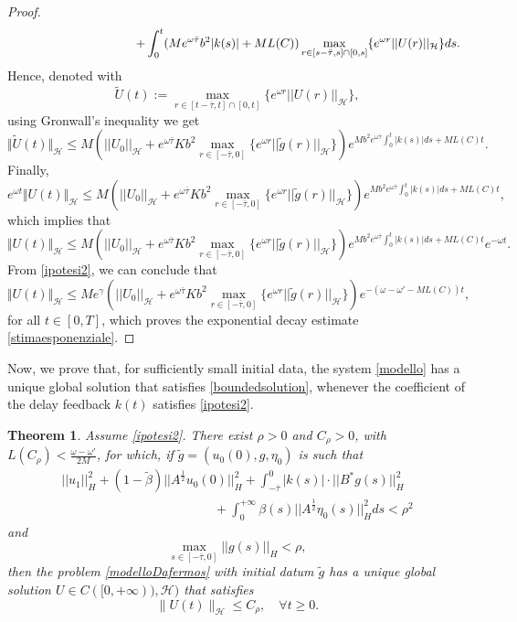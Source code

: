 \documentclass[11pt]{article}
\newtheorem{Theorem}{Theorem}[section]
\renewcommand{\geq}{\geqslant}
\renewcommand{\leq}{\leqslant}
\renewcommand{\le}{\leqslant}
\begin{document}
\begin{proof}
$$\begin{array}{l}
	\hspace{2 cm}
	\displaystyle{\hspace{1.5cm} +\int_{0}^{t}(Me^{\omega\bar{\tau}}b^2|k(s)|+ML(C))\max_{r\in[s-\bar{\tau},s]\cap[0,s]}\{e^{\omega r}||U(r)||_{\mathcal H}\} ds.}
\end{array}
$$
Hence, denoted with 
$$\tilde{U}(t):=\max_{r\in[t-\bar{\tau},t]\cap[0,t]}\{e^{\omega r} ||U(r)||_{\mathcal H} \},$$
using Gronwall's inequality we get
$$
\Vert \tilde U(t)\Vert_{\mathcal H}\le
M\left(||U_0||_{\mathcal H}+e^{\omega\bar{\tau}}Kb^2\max_{r\in[-\bar{\tau},0]}\{e^{\omega r}||\tilde{g}(r)||_{\mathcal H}\}\right)e^{Mb^2e^{\omega\bar{\tau}}\int_{0}^{t}|k(s)|ds+ML(C)t}.
$$
Finally,
$$e^{\omega t}\Vert U(t)\Vert_{\mathcal H}\leq M\left(||U_0||_{\mathcal H}+e^{\omega\bar{\tau}}Kb^2\max_{r\in[-\bar{\tau},0]}\{e^{\omega r}||\tilde{g}(r)||_{\mathcal H}\}\right)e^{Mb^2e^{\omega\bar{\tau}}\int_{0}^{t}|k(s)|ds+ML(C)t},$$
which implies that
$$\Vert U(t)\Vert_{\mathcal H}\leq M\left(||U_0||_{\mathcal H}+e^{\omega\bar{\tau}}Kb^2\max_{r\in[-\bar{\tau},0]}\{e^{\omega r}||\tilde{g}(r)||_{\mathcal H}\}\right)e^{Mb^2e^{\omega\bar{\tau}}\int_{0}^{t}|k(s)|ds+ML(C)t}e^{-\omega t}.$$
From \eqref{ipotesi2}, we can conclude that
$$\Vert  U(t)\Vert_{\mathcal H}\le Me^{\gamma}\left(||U_0||_{\mathcal H}+e^{\omega\bar{\tau}}Kb^2\max_{r\in[-\bar{\tau},0]}\{e^{\omega r}||\tilde{g}(r)||_{\mathcal H}\}\right)e^{-(\omega-\omega'-ML(C))t},$$
for all $t\in [0,T]$, which proves the exponential decay estimate \eqref{stimaesponenziale}. 
\end{proof}
Now, we prove that, for sufficiently small initial data, the system \eqref{modello} has a unique global solution that satisfies \eqref{boundedsolution}, whenever the coefficient of the delay feedback $k(t)$ satisfies \eqref{ipotesi2}.
\begin{Theorem}\label{teorema2.5}
	Assume \eqref{ipotesi2}. There exist $\rho>0$ and $C_{\rho}>0$, with $L(C_{\rho})<\frac{\omega-\omega'}{2M}$, for which, if $\tilde g=(u_0(0),g,\eta_0)$ is such that
	\begin{equation}\label{smallness}
		\begin{array}{l}
			\displaystyle{||u_1||^2_{H}+(1-\tilde{\beta})||A^{\frac{1}{2}}u_0(0)||^2_{H}+\int_{-\bar\tau}^0|k(s)|\cdot||B^*g(s)||^2_{H}}\\
			\displaystyle{\hspace{5cm}+\int_{0}^{+\infty}\beta(s)||A^{\frac{1}{2}}\eta_0(s)||^2_{H}ds<\rho^2}
\end{array}
\end{equation}
and
\begin{equation}\label{smallness_bis}
			\displaystyle{\max_{s\in [-\bar{\tau},0]}||g(s)||_{H}<\rho,}
	\end{equation}
then the problem \eqref{modelloDafermos} with  initial datum $\tilde{g}$ has a unique global solution $U\in C([0,+\infty)),\mathcal{H})$ that satisfies
\begin{equation}\label{boundedsol2}
	\lVert U(t)\rVert_{\mathcal{H}}\leq C_{\rho},\quad \forall t\geq 0.
\end{equation} 
\end{Theorem}
\end{document}
